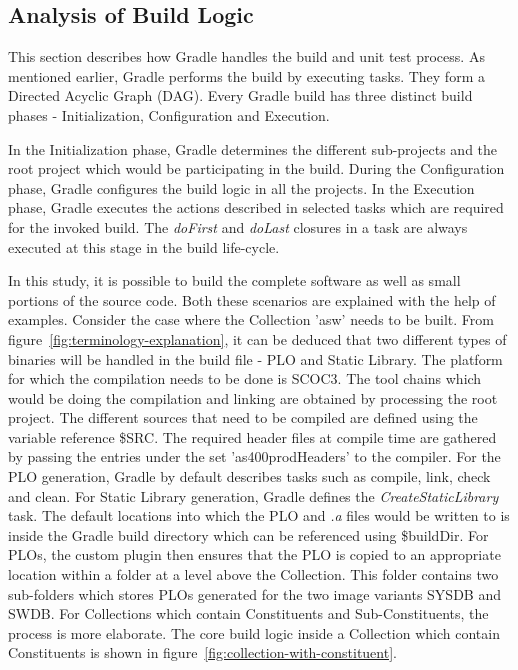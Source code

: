 \documentclass[12pt, a4paper, titlepage]{scrartcl}
\begin{document}
\subsection{Analysis of Build Logic}
\par This section describes how Gradle handles the build and unit test process. As mentioned earlier, Gradle performs the build by executing tasks. They form a Directed Acyclic Graph (DAG)\cite{thulasiraman2011graphs}. Every Gradle build has three distinct build phases - Initialization, Configuration and Execution. 
\par In the Initialization phase, Gradle determines the different sub-projects and the root project which would be participating in the build. During the Configuration phase, Gradle configures the build logic in all the projects. In the Execution phase, Gradle executes the actions described in selected tasks which are required for the invoked build. The \emph{doFirst} and \emph{doLast} closures in a task are always executed at this stage in the build life-cycle. 
\par In this study, it is possible to build the complete software as well as small portions of the source code. Both these scenarios are explained with the help of examples. Consider the case where the Collection 'asw' needs to be built. From figure~\ref{fig:terminology-explanation}, it can be deduced that two different types of binaries will be handled in the build file - PLO and Static Library. The platform for which the compilation needs to be done is SCOC3. The tool chains which would be doing the compilation and linking are obtained by processing the root project. The different sources that need to be compiled are defined using the variable reference \$SRC. The required header files at compile time are gathered by passing the entries under the set 'as400prodHeaders' to the compiler. For the PLO generation, Gradle by default describes tasks such as compile, link, check and clean. For Static Library generation, Gradle defines the \emph{CreateStaticLibrary} task. The default locations into which the PLO and \emph{.a} files would be written to is inside the Gradle build directory which can be referenced using \$buildDir. For PLOs, the custom plugin then ensures that the PLO is copied to an appropriate location within a folder at a level above the Collection. This folder contains two sub-folders which stores PLOs generated for the two image variants SYSDB and SWDB. For Collections which contain Constituents and Sub-Constituents, the process is more elaborate. The core build logic inside a Collection which contain Constituents is shown in figure~\ref{fig:collection-with-constituent}. 
\end{document}

